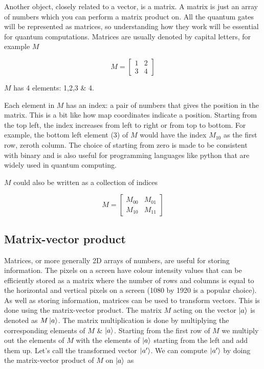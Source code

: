 Another object, closely related to a vector, is a matrix. A matrix is just an array of numbers which you can perform a matrix product on. All the quantum gates will be represented as matrices, so understanding how they work will be essential for quantum computations. Matrices are usually denoted by capital letters, for example $M$

$$ M = \begin{bmatrix} 1 & 2  \\ 3 & 4 \end{bmatrix} $$

$M$ has 4 elements: 1,2,3 \& 4. 

Each element in $M$ has an index: a pair of numbers that gives the position in the matrix. This is a bit like how map coordinates indicate a position. Starting from the top left, the index increases from left to right or from top to bottom. For example, the bottom left element (3) of $M$ would have the index $M_{10}$ as the first row, zeroth column. The choice of starting from zero is made to be consistent with binary and is also useful for programming languages like python that are widely used in quantum computing. 

$M$ could also be written as a collection of indices

$$ M = \begin{bmatrix} M_{00} & M_{01}  \\ M_{10} & M_{11} \end{bmatrix} $$


\subsection{ Matrix-vector product} 


Matrices, or more generally 2D arrays of numbers, are useful for storing information. The pixels on a screen have colour intensity values that can be efficiently stored as a matrix where the number of rows and columns is equal to the horizontal and vertical pixels on a screen (1080 by 1920 is a popular choice). As well as storing information, matrices can be used to transform vectors. This is done using the matrix-vector product. The matrix $M$ acting on the vector $\ket{a}$ is denoted as $M\ket{a}$. The matrix multiplication is done by multiplying the corresponding elements of $M$ \& $\ket{a}$. Starting from the first row of $M$ we multiply out the elements of $M$ with the elements of $\ket{a}$ starting from the left and add them up. Let's call the transformed vector $\ket{a'}$. We can compute $\ket{a'}$ by doing the matrix-vector product of $M$ on $\ket{a}$ as


